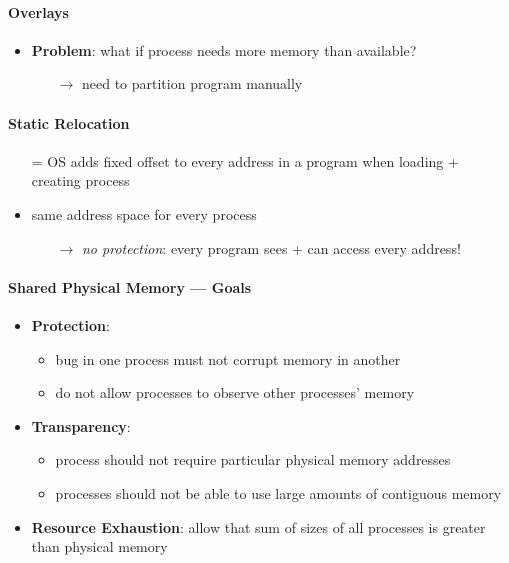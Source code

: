 \paragraph{Overlays}
\begin{itemize}
  \item \textbf{Problem}: what if process needs more memory than available?
  \begin{itemize}
    \item[$ \to $] need to partition program manually
  \end{itemize}
\end{itemize}

\paragraph{Static Relocation}
\begin{itemize}
  \item[=] OS adds fixed offset to every address in a program when loading + creating process
  \item same address space for every process
  \begin{itemize}
    \item[$ \to $] \emph{no protection}: every program sees + can access every address!
  \end{itemize}
\end{itemize}

\paragraph{Shared Physical Memory --- Goals}
\begin{itemize}
  \item \textbf{Protection}:
  \begin{itemize}
    \item bug in one process must not corrupt memory in another
    \item do not allow processes to observe other processes' memory
  \end{itemize}
  \item \textbf{Transparency}:
  \begin{itemize}
    \item process should not require particular physical memory addresses
    \item processes should not be able to use large amounts of contiguous memory
  \end{itemize}
  \item \textbf{Resource Exhaustion}: allow that sum of sizes of all processes is greater than physical memory
\end{itemize}

